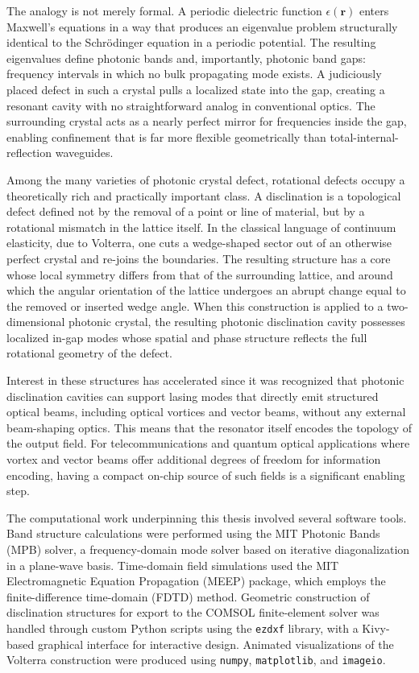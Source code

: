 \documentclass[12pt,a4paper,oneside]{book}
\theoremstyle{plain}
\theoremstyle{definition}
\theoremstyle{remark}
\newcommand{\vb}[1]{\bm{#1}}
\newcommand{\eps}{\epsilon}
\newcommand{\rvec}{\vb{r}}
\begin{document}
The analogy is not merely formal. A periodic dielectric function $\eps(\rvec)$ enters Maxwell's equations in a way that produces an eigenvalue problem structurally identical to the Schr\"{o}dinger equation in a periodic potential. The resulting eigenvalues define photonic bands and, importantly, photonic band gaps: frequency intervals in which no bulk propagating mode exists. A judiciously placed defect in such a crystal pulls a localized state into the gap, creating a resonant cavity with no straightforward analog in conventional optics. The surrounding crystal acts as a nearly perfect mirror for frequencies inside the gap, enabling confinement that is far more flexible geometrically than total-internal-reflection waveguides.

Among the many varieties of photonic crystal defect, rotational defects occupy a theoretically rich and practically important class. A disclination is a topological defect defined not by the removal of a point or line of material, but by a rotational mismatch in the lattice itself. In the classical language of continuum elasticity, due to Volterra, one cuts a wedge-shaped sector out of an otherwise perfect crystal and re-joins the boundaries. The resulting structure has a core whose local symmetry differs from that of the surrounding lattice, and around which the angular orientation of the lattice undergoes an abrupt change equal to the removed or inserted wedge angle. When this construction is applied to a two-dimensional photonic crystal, the resulting photonic disclination cavity possesses localized in-gap modes whose spatial and phase structure reflects the full rotational geometry of the defect.

Interest in these structures has accelerated since it was recognized that photonic disclination cavities can support lasing modes that directly emit structured optical beams, including optical vortices and vector beams, without any external beam-shaping optics. This means that the resonator itself encodes the topology of the output field. For telecommunications and quantum optical applications where vortex and vector beams offer additional degrees of freedom for information encoding, having a compact on-chip source of such fields is a significant enabling step.

The computational work underpinning this thesis involved several software tools. Band structure calculations were performed using the MIT Photonic Bands (MPB) solver, a frequency-domain mode solver based on iterative diagonalization in a plane-wave basis. Time-domain field simulations used the MIT Electromagnetic Equation Propagation (MEEP) package, which employs the finite-difference time-domain (FDTD) method. Geometric construction of disclination structures for export to the COMSOL finite-element solver was handled through custom Python scripts using the \texttt{ezdxf} library, with a Kivy-based graphical interface for interactive design. Animated visualizations of the Volterra construction were produced using \texttt{numpy}, \texttt{matplotlib}, and \texttt{imageio}.
\end{document}

